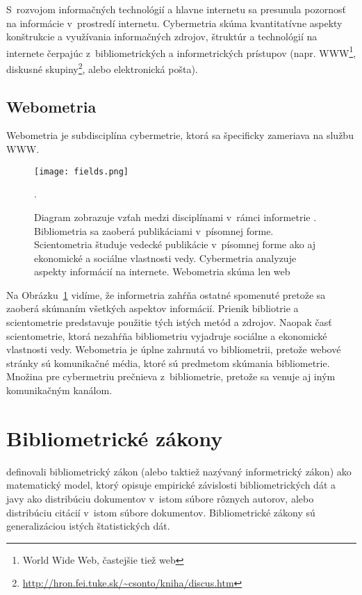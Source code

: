 S~rozvojom informačných technológií a hlavne internetu sa presunula pozornosť
na informácie v~prostredí internetu.  Cybermetria skúma kvantitatívne aspekty
konštrukcie a využívania informačných zdrojov, štruktúr a technológií na
internete čerpajúc z~bibliometrických a informetrických prístupov (napr.
WWW\footnote{World Wide Web, častejšie tiež web}, diskusné skupiny\footnote{\url{http://hron.fei.tuke.sk/~csonto/kniha/discus.htm}}, alebo
elektronická pošta).


\subsection{Webometria}

Webometria je subdisciplína cybermetrie, ktorá sa špecificky zameriava na službu WWW.


\begin{figure}
  \centering
  \texttt{[image: fields.png]}
  \caption[Vzťah medzi jednotlivými disciplínami v~rámci informetrie.]
    {Diagram zobrazuje vzťah medzi disciplínami v~rámci informetrie .
    Bibliometria sa zaoberá publikáciami v~písomnej forme.
    Scientometria študuje vedecké publikácie v~písomnej forme ako aj
    ekonomické a sociálne vlastnosti vedy. Cybermetria analyzuje aspekty informácií
    na internete. Webometria skúma len web \citep{Bjorneborn2004}}.
  \label{fig:fields}
\end{figure}



Na Obrázku~\ref{fig:fields} vidíme, že informetria zahŕňa ostatné spomenuté
 pretože sa zaoberá skúmaním všetkých aspektov informácií.  Prienik
bibliotrie a scientometrie predstavuje použitie tých istých metód a zdrojov.
Naopak časť scientometrie, ktorá nezahŕňa bibliometriu vyjadruje sociálne a
ekonomické vlastnosti vedy. Webometria je úplne zahrnutá vo bibliometrii,
pretože webové stránky sú komunikačné média, ktoré sú predmetom skúmania
bibliometrie.  Množina pre cybermetriu prečnieva z~bibliometrie, pretože sa
venuje aj iným komunikačným kanálom.

\section{Bibliometrické zákony}

\citet{Todeschini2016} definovali bibliometrický zákon (alebo taktiež nazývaný
informetrický zákon) ako matematický model, ktorý opisuje empirické závislosti
bibliometrických dát a javy ako distribúciu dokumentov v~istom súbore rôznych
autorov, alebo distribúciu citácií v~istom súbore dokumentov.  Bibliometrické
zákony sú generalizáciou istých štatistických dát.

